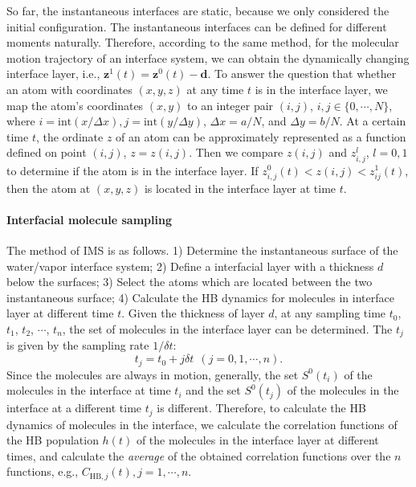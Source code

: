 So far, the instantaneous interfaces are static, because we only considered the initial configuration. 
The instantaneous interfaces can be defined for different moments naturally. 
Therefore, according to the same method, for the molecular motion trajectory of an interface system, 
we can obtain the dynamically changing interface layer, i.e., ${\mathbf z}^1(t)={\mathbf z}^0(t)-{\mathbf d}$. 
To answer the question that whether an atom with coordinates $(x, y, z)$ at any time $t$ is in the interface layer,
we map the atom's coordinates $(x, y)$ to an integer pair $(i, j)$, $i,j \in  \{0,\cdots,N\}$, 
where $i = \text{int}(x /\Delta x), j = \text{int}(y/\Delta y)$, $\Delta x = a/N$, and $\Delta y = b/N$.
At a certain time $t$, the ordinate $z$ of an atom can be approximately represented as a function defined on point $(i, j)$, $z=z(i,j)$. 
Then we compare $z(i,j)$ and $z^l_{i,j}$, $l=0,1$ to determine if the atom is in the interface layer. 
If $z^0_{i,j}(t)<z(i,j)<z^1_{ij}(t)$, then the atom at $(x,y,z)$ is located in the interface layer at time $t$.

\paragraph{Interfacial molecule sampling}\label{para_MS_interface}
The method of IMS is as follows. 
1) Determine the instantaneous surface of the water/vapor interface system;
2) Define a interfacial layer with a thickness $d$ below the surfaces; 
3) Select the atoms which are located between the two instantaneous surface;
4) Calculate the HB dynamics for molecules in interface layer at different time $t$.
Given the thickness of layer $d$, at any sampling time $t_0$, $t_1$, $t_2$, $\cdots$, $t_n$, the set of molecules in the interface layer can be determined.
The $t_j$ is given by the sampling rate $1/{\delta}t$:
\begin{equation}
t_j = t_0 + j{\delta} t \ \ (j=0,1,\cdots,n).
\end{equation}
Since the molecules are always in motion, generally, the set $S^0(t_i)$ of the molecules in the interface at time $t_i$ 
and the set $S^0(t_j)$ of the molecules in the interface at a different time $t_j$ is different. 
Therefore, to calculate the HB dynamics of molecules in the interface, we calculate the correlation functions of 
the HB population $h(t)$ of the molecules in the interface layer at different times, 
and calculate the \emph{average} of the obtained correlation functions 
over the $n$ functions, e.g., $C_{\text{HB},j}(t), j=1,\cdots,n$.
 
